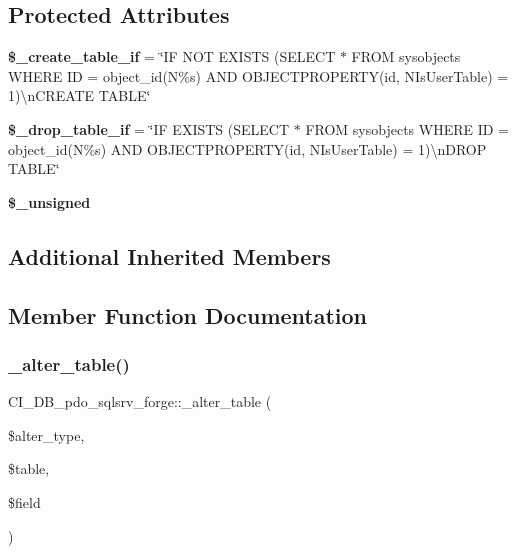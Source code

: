 \subsection*{Protected Attributes}
\begin{DoxyCompactItemize}
\item 
\mbox{\label{class_c_i___d_b__pdo__sqlsrv__forge_a6eacdcdea95e61b5975acc47403d714c}} 
{\bfseries \$\+\_\+create\+\_\+table\+\_\+if} = \char`\"{}IF N\+OT E\+X\+I\+S\+TS (S\+E\+L\+E\+CT $\ast$ F\+R\+OM sysobjects W\+H\+E\+RE ID = object\+\_\+id(N\textquotesingle{}\%s\textquotesingle{}) A\+ND O\+B\+J\+E\+C\+T\+P\+R\+O\+P\+E\+R\+TY(id, N\textquotesingle{}Is\+User\+Table\textquotesingle{}) = 1)\textbackslash{}n\+C\+R\+E\+A\+TE T\+A\+B\+LE\char`\"{}
\item 
\mbox{\label{class_c_i___d_b__pdo__sqlsrv__forge_a2e7467971c678e8b911048ac31d3931d}} 
{\bfseries \$\+\_\+drop\+\_\+table\+\_\+if} = \char`\"{}IF E\+X\+I\+S\+TS (S\+E\+L\+E\+CT $\ast$ F\+R\+OM sysobjects W\+H\+E\+RE ID = object\+\_\+id(N\textquotesingle{}\%s\textquotesingle{}) A\+ND O\+B\+J\+E\+C\+T\+P\+R\+O\+P\+E\+R\+TY(id, N\textquotesingle{}Is\+User\+Table\textquotesingle{}) = 1)\textbackslash{}n\+D\+R\+OP T\+A\+B\+LE\char`\"{}
\item 
{\bfseries \$\+\_\+unsigned}
\end{DoxyCompactItemize}
\subsection*{Additional Inherited Members}


\subsection{Member Function Documentation}
\mbox{\label{class_c_i___d_b__pdo__sqlsrv__forge_ada38b9f9d156c7e09ba66bb94c5de4d1}} 
\subsubsection{\texorpdfstring{\+\_\+alter\+\_\+table()}{\_alter\_table()}}
{\footnotesize\ttfamily C\+I\+\_\+\+D\+B\+\_\+pdo\+\_\+sqlsrv\+\_\+forge\+::\+\_\+alter\+\_\+table (\begin{DoxyParamCaption}\item[{}]{\$alter\+\_\+type,  }\item[{}]{\$table,  }\item[{}]{\$field }\end{DoxyParamCaption})\hspace{0.3cm}{\ttfamily [protected]}}

